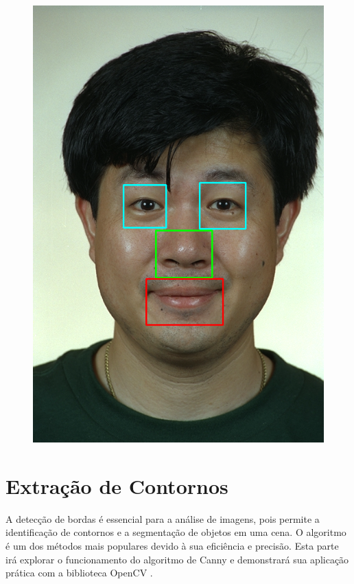 \begin{figure}[h!]
    \begin{minipage}[b]{0.45\textwidth}
        \centering
        \includegraphics[width=0.9\linewidth]{fig/02_detected_features.png}
        \label{fig:caracteristicas}
    \end{minipage}
    \label{fig:deteccao-caracteristicas}
\end{figure}



\section{Extração de Contornos}

A detecção de bordas é essencial para a análise de imagens, pois permite a identificação de contornos e a segmentação de objetos em uma cena. O algoritmo \cite{Canny} é um dos métodos mais populares devido à sua eficiência e precisão. Esta parte irá explorar o funcionamento do algoritmo de Canny e demonstrará sua aplicação prática com a biblioteca OpenCV \cite{CannyAplicacao}.

